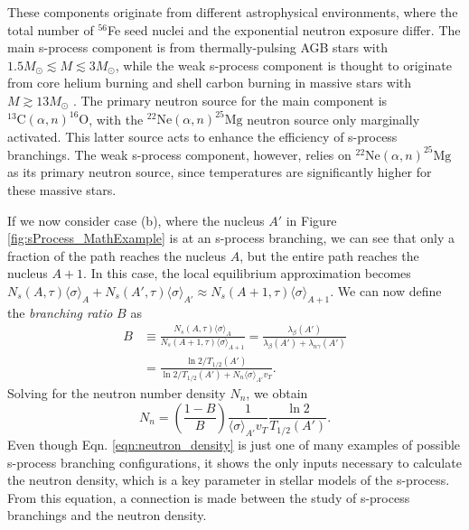 These components originate from different astrophysical environments, where the total number of $^{56}$Fe seed nuclei and the exponential neutron exposure differ. The main s-process component is from thermally-pulsing AGB stars with $1.5 M_{\odot} \lesssim M \lesssim 3 M_{\odot}$, while the weak s-process component is thought to originate from core helium burning and shell carbon burning in massive stars with $M \gtrsim 13 M_{\odot}$ \cite{Iliadis2015}. The primary neutron source for the main component is $^{13}\mathrm{C}(\alpha,n)^{16}\mathrm{O}$, with the $^{22}\mathrm{Ne}(\alpha,n)^{25}\mathrm{Mg}$ neutron source only marginally activated. This latter source acts to enhance the efficiency of s-process branchings. The weak s-process component, however, relies on $^{22}\mathrm{Ne}(\alpha,n)^{25}\mathrm{Mg}$ as its primary neutron source, since temperatures are significantly higher for these massive stars.

If we now consider case (b), where the nucleus $A'$ in Figure \ref{fig:sProcess_MathExample} is at an s-process branching, we can see that only a fraction of the path reaches the nucleus $A$, but the entire path reaches the nucleus $A+1$. In this case, the local equilibrium approximation becomes $N_{s}(A,\tau)\langle \sigma \rangle_{A} + N_{s}(A',\tau)\langle \sigma \rangle_{A'} \approx N_{s}(A+1,\tau)\langle \sigma \rangle_{A+1}$. We can now define the \emph{branching ratio} $B$ as
\begin{align}
B &\equiv \frac{N_{s}(A,\tau)\langle \sigma \rangle_{A}}{N_{s}(A+1,\tau)\langle \sigma \rangle_{A+1}} = \frac{\lambda_{\beta}(A')}{\lambda_{\beta}(A') + \lambda_{n\gamma}(A')} \nonumber \\
&= \frac{\ln 2 / T_{1/2}(A')}{\ln 2 / T_{1/2}(A') + N_{n} \langle \sigma \rangle_{A'} v_{T}}.
\end{align}
Solving for the neutron number density $N_{n}$, we obtain
\begin{equation} \label{eqn:neutron_density}
N_{n} = \left( \frac{1-B}{B} \right) \frac{1}{\langle \sigma \rangle_{A'} v_{T}} \frac{\ln 2}{T_{1/2}(A')}.
\end{equation}
Even though Eqn. \ref{eqn:neutron_density} is just one of many examples of possible s-process branching configurations, it shows the only inputs necessary to calculate the neutron density, which is a key parameter in stellar models of the s-process. From this equation, a connection is made between the study of s-process branchings and the neutron density. 

